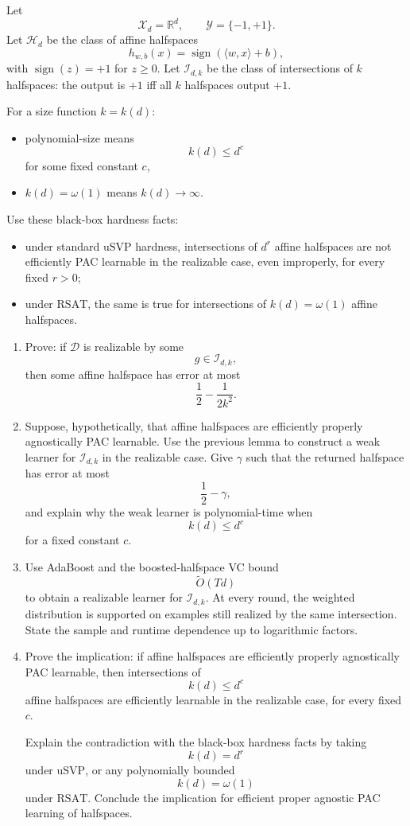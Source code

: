 \documentclass{article}
\begin{document}
Let
$$
\mathcal{X}_d=\mathbb{R}^d,
\qquad
\mathcal{Y}=\{-1,+1\}.
$$
Let $\mathcal{H}_d$ be the class of affine halfspaces
$$
h_{w,b}(x)=\operatorname{sign}(\langle w,x\rangle + b),
$$
with $\operatorname{sign}(z)=+1$ for $z\ge 0$. Let $\mathcal{I}_{d,k}$ be the class of intersections of $k$ halfspaces: the output is $+1$ iff all $k$ halfspaces output $+1$.

For a size function $k=k(d)$:
\begin{itemize}
\item polynomial-size means
$$
k(d)\le d^c
$$
for some fixed constant $c$,
\item $k(d)=\omega(1)$ means $k(d)\to\infty$.
\end{itemize}

Use these black-box hardness facts:
\begin{itemize}
\item under standard $\mathrm{uSVP}$ hardness, intersections of $d^r$ affine halfspaces are not efficiently PAC learnable in the realizable case, even improperly, for every fixed $r>0$;
\item under $\mathrm{RSAT}$, the same is true for intersections of $k(d)=\omega(1)$ affine halfspaces.
\end{itemize}

\begin{enumerate}
\item Prove: if $\mathcal{D}$ is realizable by some
$$
g\in \mathcal{I}_{d,k},
$$
then some affine halfspace has error at most
$$
\frac12-\frac{1}{2k^2}.
$$

\item Suppose, hypothetically, that affine halfspaces are efficiently properly agnostically PAC learnable. Use the previous lemma to construct a weak learner for $\mathcal{I}_{d,k}$ in the realizable case. Give $\gamma$ such that the returned halfspace has error at most
$$
\frac12-\gamma,
$$
and explain why the weak learner is polynomial-time when
$$
k(d)\le d^c
$$
for a fixed constant $c$.

\item Use AdaBoost and the boosted-halfspace VC bound
$$
\widetilde{O}(Td)
$$
to obtain a realizable learner for $\mathcal{I}_{d,k}$. At every round, the weighted distribution is supported on examples still realized by the same intersection. State the sample and runtime dependence up to logarithmic factors.

\item Prove the implication: if affine halfspaces are efficiently properly agnostically PAC learnable, then intersections of
$$
k(d)\le d^c
$$
affine halfspaces are efficiently learnable in the realizable case, for every fixed $c$.

Explain the contradiction with the black-box hardness facts by taking
$$
k(d)=d^r
$$
under $\mathrm{uSVP}$, or any polynomially bounded
$$
k(d)=\omega(1)
$$
under $\mathrm{RSAT}$. Conclude the implication for efficient proper agnostic PAC learning of halfspaces.
\end{enumerate}
\end{document}
